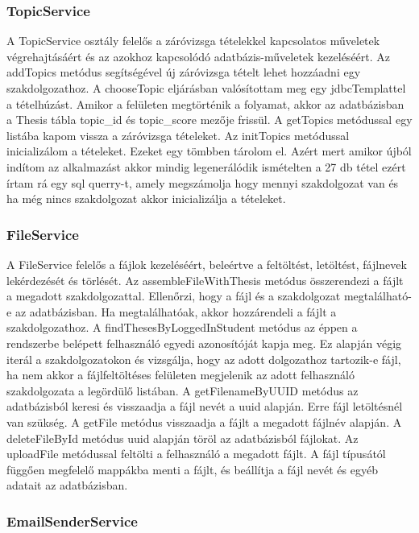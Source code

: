 \subsubsection{TopicService}

A TopicService osztály felelős a záróvizsga tételekkel kapcsolatos műveletek végrehajtásáért és az azokhoz kapcsolódó adatbázis-műveletek kezeléséért. Az addTopics metódus segítségével új záróvizsga tételt lehet hozzáadni egy szakdolgozathoz. A chooseTopic eljárásban valósítottam meg egy jdbcTemplattel a tételhúzást. Amikor a felületen megtörténik a folyamat, akkor az adatbázisban a Thesis tábla topic\_id és topic\_score mezője frissül. A getTopics metódussal egy listába kapom vissza a záróvizsga tételeket. Az initTopics metódussal inicializálom a tételeket. Ezeket egy tömbben tárolom el. Azért mert amikor újból indítom az alkalmazást akkor mindig legenerálódik ismételten a 27 db tétel ezért írtam rá egy sql querry-t, amely megszámolja hogy mennyi szakdolgozat van és ha még nincs szakdolgozat akkor inicializálja a tételeket.

\subsubsection{FileService}%

A FileService felelős a fájlok kezeléséért, beleértve a feltöltést, letöltést, fájlnevek lekérdezését és törlését. Az assembleFileWithThesis metódus összerendezi a fájlt a megadott szakdolgozattal. Ellenőrzi, hogy a fájl és a szakdolgozat megtalálható-e az adatbázisban. Ha megtalálhatóak, akkor hozzárendeli a fájlt a szakdolgozathoz. A findThesesByLoggedInStudent metódus az éppen a rendszerbe belépett felhasználó egyedi azonosítóját kapja meg. Ez alapján végig iterál a szakdolgozatokon és vizsgálja, hogy az adott dolgozathoz tartozik-e fájl, ha nem akkor a fájlfeltöltéses felületen megjelenik az adott felhasználó szakdolgozata a legördülő listában. A getFilenameByUUID metódus az adatbázisból keresi és visszaadja a fájl nevét a uuid alapján. Erre fájl letöltésnél van szükség. A getFile metódus visszaadja a fájlt a megadott fájlnév alapján. A deleteFileById metódus uuid alapján töröl az adatbázisból fájlokat. Az uploadFile metódussal feltölti a felhasználó a megadott fájlt. A fájl típusától függően megfelelő mappákba menti a fájlt, és beállítja a fájl nevét és egyéb adatait az adatbázisban.

\subsubsection{EmailSenderService}

